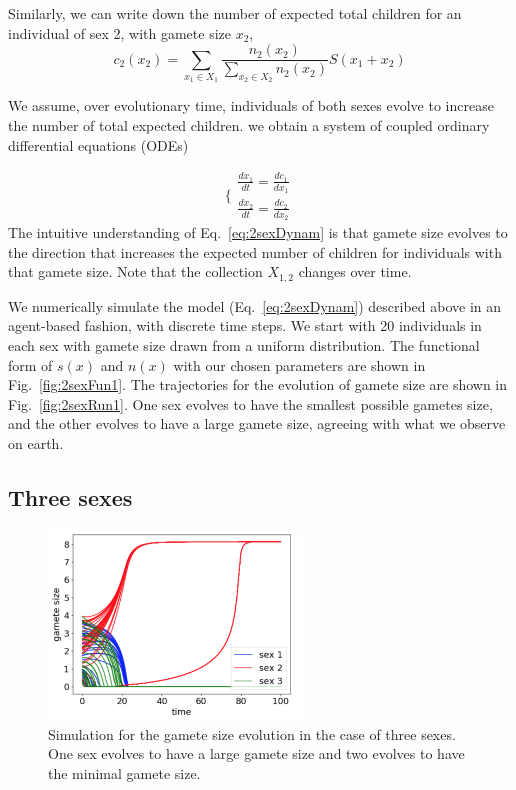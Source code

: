 Similarly, we can write down the number of expected total children for an individual of sex 2, with gamete size $x_2$, 
\begin{equation}
    c_2(x_2) = \sum_{x_1 \in X_1} \frac{n_2(x_2)}{\sum_{x_2\in X_2} n_2(x_2)} S(x_1+ x_2) 
\end{equation}

We assume, over evolutionary time, individuals of both sexes evolve to increase the number of total expected children. we obtain a system of coupled ordinary differential equations (ODEs)

\begin{equation} \label{eq:2sexDynam}
\Bigg\{
\begin{array}{ll}
\frac{dx_1}{dt} = \frac{dc_1}{dx_1} \\
\frac{dx_2}{dt} = \frac{dc_2}{dx_2}  
     \end{array}
\end{equation}
The intuitive understanding of Eq.~\ref{eq:2sexDynam} is that gamete size evolves to the direction that increases the expected number of children for individuals with that gamete size. Note that the collection $X_{1,2}$ changes over time. 

We numerically simulate the model (Eq.~\ref{eq:2sexDynam}) described above in an agent-based fashion, with discrete time steps. We start with 20 individuals in each sex with gamete size drawn from a uniform distribution. The functional form of  $s(x)$ and $n(x)$ with our chosen parameters are shown in Fig.~\ref{fig:2sexFun1}. The trajectories for the evolution of gamete size are shown in Fig.~\ref{fig:2sexRun1}. One sex evolves to have the smallest possible gametes size, and the other evolves to have a large gamete size, agreeing with what we observe on earth. 


\subsection{Three sexes}


\begin{figure}[htb!]
    \centering
    \includegraphics[width = 0.6\textwidth]{vickysFigs/3_sex_run1}
    \caption{Simulation for the gamete size evolution in the case of three sexes. One sex evolves to have a large gamete size and two evolves to have the minimal gamete size. }
    \label{fig:3sexRun1}
\end{figure}


